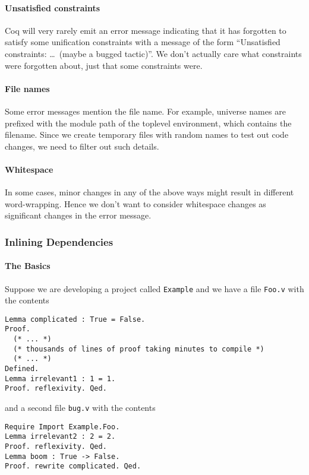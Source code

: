 \documentclass[a4paper,UKenglish,anonymous,cleveref,autoref,thm-restate]{lipics-v2021}
\begin{document}
\paragraph{Unsatisfied constraints}
Coq will very rarely emit an error message indicating that it has forgotten to satisfy some unification constraints with a message of the form ``Unsatisfied constraints: \ldots\ (maybe a bugged tactic)''.
We don't actually care what constraints were forgotten about, just that some constraints were.

\paragraph{File names}
Some error messages mention the file name.
For example, universe names are prefixed with the module path of the toplevel environment, which contains the filename.
Since we create temporary files with random names to test out code changes, we need to filter out such details.

\paragraph{Whitespace}
In some cases, minor changes in any of the above ways might result in different word-wrapping.
Hence we don't want to consider whitespace changes as significant changes in the error message.

\subsubsection{Inlining Dependencies}\label{sec:inline-deps}

\paragraph{The Basics}

Suppose we are developing a project called \verb|Example| and we have a file \verb|Foo.v| with the contents
\begin{verbatim}
Lemma complicated : True = False.
Proof.
  (* ... *)
  (* thousands of lines of proof taking minutes to compile *)
  (* ... *)
Defined.
Lemma irrelevant1 : 1 = 1.
Proof. reflexivity. Qed.
\end{verbatim}
and a second file \verb|bug.v| with the contents
\begin{verbatim}
Require Import Example.Foo.
Lemma irrelevant2 : 2 = 2.
Proof. reflexivity. Qed.
Lemma boom : True -> False.
Proof. rewrite complicated. Qed.
\end{verbatim}
\end{document}
